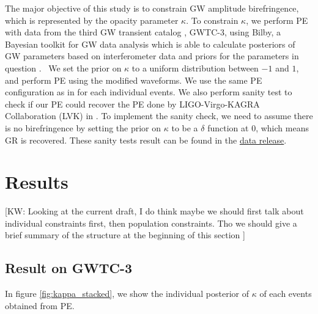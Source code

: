 \documentclass[aps,prd,twocolumn,superscriptaddress,preprintnumbers,floatfix,nofootinbib]{revtex4-2}
\newcommand{\kw}[1]{{\color{rb4}[KW: #1 ]}}
\begin{document}
The major objective of this study is to constrain GW amplitude birefringence, which is represented by the opacity parameter $\kappa$.
To constrain $\kappa$, we perform PE with data from the third GW transient catalog \citep{GWTC-2.1, GWTC-3}, GWTC-3, using Bilby, a Bayesian toolkit for GW data analysis which is able to calculate posteriors of GW parameters based on interferometer data and priors for the parameters in question \citep{Bilby}. \
We set the prior on $\kappa$ to a uniform distribution between $-1$ and $1$, and perform PE using the modified waveforms.
We use the same PE configuration as in \citet{GWTC-2.1, GWTC-3} for each individual events.
We also perform sanity test to check if our PE could recover the PE done by LIGO-Virgo-KAGRA Collaboration (LVK) in \citet{GWTC-2.1, GWTC-3}.
To implement the sanity check, we need to assume there is no birefringence by setting the prior on $\kappa$ to be a $\delta$ function at $0$, which means GR is recovered.
These sanity tests result can be found in the \href{https://zenodo.org/record/7338924}{data release}.

\section{Results}
\label{sec:Results}

\kw{Looking at the current draft, I do think maybe we should first talk about individual constraints first, then population constraints.
Tho we should give a brief summary of the structure at the beginning of this section}
\subsection{Result on GWTC-3}

In figure \ref{fig:kappa_stacked}, we show the individual posterior of $\kappa$
of each events obtained from PE. 
\end{document}
